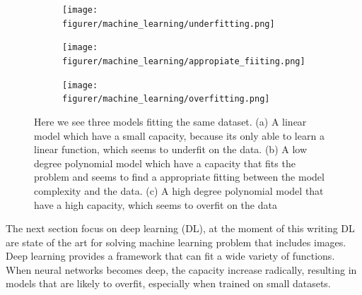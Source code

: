 \documentclass[11pt]{article}
\begin{document}
\begin{figure}[!h]
     \centering
     \begin{subfigure}[b]{0.25\textwidth}
         \centering
         \texttt{[image: figurer/machine\_learning/underfitting.png]}
         \caption{}
         \label{fig:underfitting_ML}
     \end{subfigure}
     \hfill
     \begin{subfigure}[b]{0.25\textwidth}
         \centering
         \texttt{[image: figurer/machine\_learning/appropiate\_fiiting.png]}
        \caption{}
         \label{fig:appropriate_fitting_ML}
     \end{subfigure}
     \hfill
     \begin{subfigure}[b]{0.25\textwidth}
         \centering
         \texttt{[image: figurer/machine\_learning/overfitting.png]}
         \caption{}
         \label{fig:overfitting_ML}
     \end{subfigure}
    \caption{Here we see three models fitting the same dataset. (a) A linear model which have a small capacity, because its only able to learn a linear function, which seems to underfit on the data. (b) A low degree polynomial model which have a capacity that fits the problem and seems to find a appropriate fitting between the model complexity and the data. (c) A high degree polynomial model that have a high capacity, which seems to overfit on the data}
        \label{fig:fitting}
\end{figure}
The next section focus on deep learning (DL), at the moment of this writing DL are state of the art for solving machine learning problem that includes images. Deep learning provides a framework that can fit a wide variety of functions. When neural networks becomes deep, the capacity increase radically, resulting in models that are likely to overfit, especially when trained on small datasets.
\end{document}
